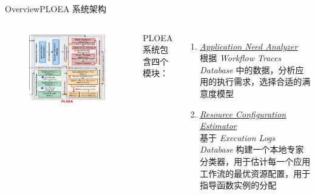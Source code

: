 \documentclass[aspectratio=169]{beamer}
\begin{document}
\begin{frame}{Overview}{PLOEA 系统架构}\label{label:architecture-1}
  \begin{columns}
    \begin{figure}
      \centering
      \includegraphics[height=0.75\textheight]{img/method/PLOEA-system-right.pdf}
    \end{figure}

    PLOEA 系统包含四个模块：
    \begin{enumerate}
      \item \hyperlink{label:application-need-analyzer}{\underline{\textit{Application Need Analyzer}}} \\
        根据 \textit{Workflow Traces Database} 中的数据，分析应用的执行需求，选择合适的满意度模型
      \item \hyperlink{label:resource-configuration-estimator}{\underline{\textit{Resource Configuration Estimator}}} \\
        基于 \textit{Execution Logs Database} 构建一个本地专家分类器，用于估计每一个应用工作流的最优资源配置，用于指导函数实例的分配
    \end{enumerate}
  \end{columns}
\end{frame}
\end{document}
